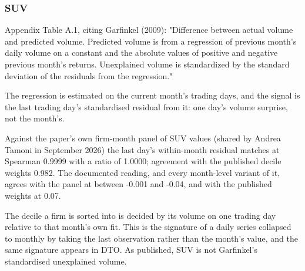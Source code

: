 \documentclass[11pt]{article}
\begin{document}
\subsubsection*{SUV}
\begin{description}[leftmargin=2.4cm,labelwidth=2.2cm,font=\normalfont\bfseries,style=sameline]
\item[Documented:] Appendix Table A.1, citing Garfinkel (2009): "Difference between actual volume and predicted volume. Predicted volume is from a regression of previous month's daily volume on a constant and the absolute values of positive and negative previous month's returns. Unexplained volume is standardized by the standard deviation of the residuals from the regression."
\item[Implemented:] The regression is estimated on the current month's trading days, and the signal is the last trading day's standardised residual from it: one day's volume surprise, not the month's.
\item[Evidence:] Against the paper's own firm-month panel of SUV values (shared by Andrea Tamoni in September 2026) the last day's within-month residual matches at Spearman 0.9999 with a ratio of 1.0000; agreement with the published decile weights 0.982. The documented reading, and every month-level variant of it, agrees with the panel at between -0.001 and -0.04, and with the published weights at 0.07.
\item[Why it matters:] The decile a firm is sorted into is decided by its volume on one trading day relative to that month's own fit. This is the signature of a daily series collapsed to monthly by taking the last observation rather than the month's value, and the same signature appears in DTO. As published, SUV is not Garfinkel's standardised unexplained volume.
\end{description}
\end{document}
